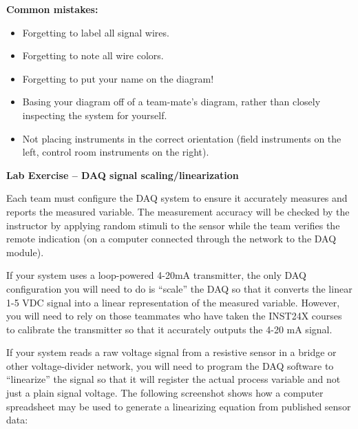 \vskip 10pt

{\bf Common mistakes:}

\begin{itemize}
\item{} Forgetting to label all signal wires.
\item{} Forgetting to note all wire colors.
\item{} Forgetting to put your name on the diagram!
\item{} Basing your diagram off of a team-mate's diagram, rather than closely inspecting the system for yourself.
\item{} Not placing instruments in the correct orientation (field instruments on the left, control room instruments on the right).
\end{itemize}





\vfil \eject

\noindent
{\bf Lab Exercise -- DAQ signal scaling/linearization}

\vskip 5pt

Each team must configure the DAQ system to ensure it accurately measures and reports the measured variable.  The measurement accuracy will be checked by the instructor by applying random stimuli to the sensor while the team verifies the remote indication (on a computer connected through the network to the DAQ module).

If your system uses a loop-powered 4-20mA transmitter, the only DAQ configuration you will need to do is ``scale'' the DAQ so that it converts the linear 1-5 VDC signal into a linear representation of the measured variable.  However, you will need to rely on those teammates who have taken the INST24X courses to calibrate the transmitter so that it accurately outputs the 4-20 mA signal.

If your system reads a raw voltage signal from a resistive sensor in a bridge or other voltage-divider network, you will need to program the DAQ software to ``linearize'' the signal so that it will register the actual process variable and not just a plain signal voltage.  The following screenshot shows how a computer spreadsheet may be used to generate a linearizing equation from published sensor data:

